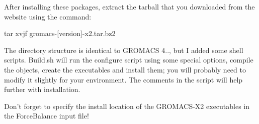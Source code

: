 \-After installing these packages, extract the tarball that you downloaded from the website using the command\-:

\begin{DoxyVerb}tar xvjf gromacs-[version]-x2.tar.bz2 \end{DoxyVerb}


\-The directory structure is identical to \-G\-R\-O\-M\-A\-C\-S 4.., but \-I added some shell scripts. {\ttfamily \-Build.\-sh} will run the configure script using some special options, compile the objects, create the executables and install them; you will probably need to modify it slightly for your environment. \-The comments in the script will help further with installation.

\-Don't forget to specify the install location of the \-G\-R\-O\-M\-A\-C\-S-\/\-X2 executables in the \-Force\-Balance input file! 